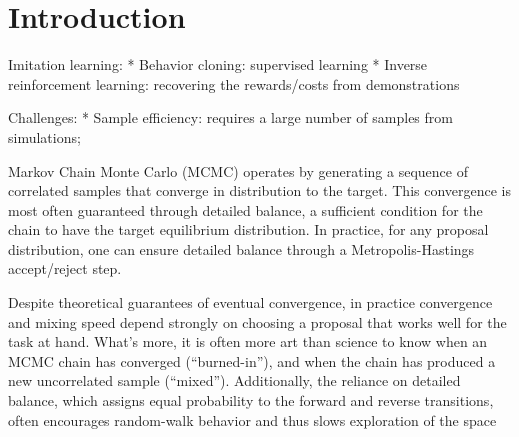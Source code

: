 \section{Introduction}
Imitation learning: 
* Behavior cloning: supervised learning
* Inverse reinforcement learning: recovering the rewards/costs from demonstrations


Challenges: 
* Sample efficiency: requires a large number of samples from simulations; 



Markov Chain Monte Carlo (MCMC) operates by generating a sequence of correlated samples that converge in distribution to the target. 
This convergence is most often guaranteed through detailed balance, a sufficient condition for the chain to have the target equilibrium distribution. 
In practice, for any proposal distribution, one can ensure detailed balance through a Metropolis-Hastings~\cite{hastings1970monte} accept/reject step.

Despite theoretical guarantees of eventual convergence, in practice convergence and mixing speed depend strongly on choosing a proposal that works well for the task at hand. 
What's more, it is often more art than science to know when an MCMC chain has converged (``burned-in''), and when the chain has produced a new uncorrelated sample (``mixed'').
Additionally, the reliance on detailed balance, which assigns equal probability to the forward and reverse transitions, often encourages random-walk behavior and thus slows exploration of the space
